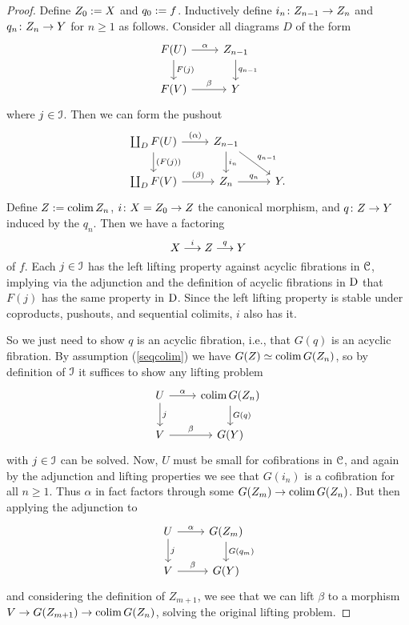 \begin{proof}
  Define $Z_0 \mathrel{:=} X$ and $q_0 \mathrel{:=} f$. Inductively define
  $i_n \colon Z_{n-1} \to Z_n$ and $q_n \colon Z_n \to Y$ for $n \ge 1$ as
  follows. Consider all diagrams $D$ of the form
  \[
  \begin{tikzcd}
    F(U) \rar{\alpha} \dar{F(j)} & Z_{n-1} \dar{q_{n-1}} \\ F(V)
    \rar{\beta} & Y
  \end{tikzcd}
  \]
  where $j \in \mathcal{I}$. Then we can form the pushout
  \[
  \begin{tikzcd}
    \coprod_D F(U) \rar{(\alpha)} \dar{(F(j))} & Z_{n-1} \dar{i_n}
    \drar{q_{n-1}} \\ \coprod_D F(V) \rar{(\beta)} & Z_n \rar{q_n} &
    Y.
  \end{tikzcd}
  \]
  Define $Z \mathrel{:=} \operatorname{colim} Z_n$, $i \colon X = Z_0 \to Z$ the canonical
  morphism, and $q \colon Z \to Y$ induced by the $q_n$. Then we have a
  factoring
  \[
  X \overset{i}{\longrightarrow} Z \overset{q}{\longrightarrow} Y
  \]
  of $f$. Each $j \in \mathcal{I}$ has the left lifting property against
  acyclic fibrations in $\mathcal{C}$, implying via the adjunction and the
  definition of acyclic fibrations in $\mathrm{D}$ that $F(j)$ has the same
  property in $\mathrm{D}$. Since the left lifting property is stable under
  coproducts, pushouts, and sequential colimits, $i$ also has it.

  So we just need to show $q$ is an acyclic fibration, i.e., that
  $G(q)$ is an acyclic fibration. By assumption (\ref{seqcolim}) we
  have $G(Z) \simeq \operatorname{colim} G(Z_n)$, so by definition of $\mathcal{I}$ it
  suffices to show any lifting problem
  \[
  \begin{tikzcd}
    U \rar{\alpha} \dar{j} & \colim G(Z_n) \dar{G(q)} \\ V \rar{\beta}
    & G(Y)
  \end{tikzcd}
  \]
  with $j \in \mathcal{I}$ can be solved. Now, $U$ must be small for
  cofibrations in $\mathcal{C}$, and again by the adjunction and lifting
  properties we see that $G(i_n)$ is a cofibration for all $n \ge
  1$. Thus $\alpha$ in fact factors through some $G(Z_m) \to \operatorname{colim}
  G(Z_n)$. But then applying the adjunction to
  \[
  \begin{tikzcd}
    U \rar{\alpha} \dar{j} & G(Z_m) \dar{G(q_m)} \\ V \rar{\beta} &
    G(Y)
  \end{tikzcd}
  \]
  and considering the definition of $Z_{m+1}$, we see that we can lift
  $\beta$ to a morphism $V \to G(Z_{m+1}) \to \operatorname{colim} G(Z_n)$, solving
  the original lifting problem.
\end{proof}

